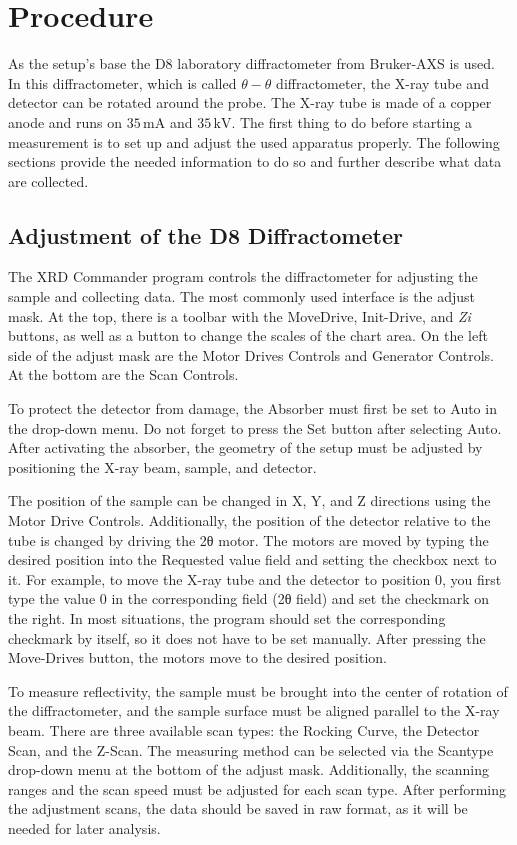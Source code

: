 \section{Procedure}

As the setup's base the D8 laboratory diffractometer from Bruker-AXS is used.
In this diffractometer, which is called $\theta - \theta$ diffractometer, the X-ray tube and detector can be rotated around the probe.
The X-ray tube is made of a copper anode and runs on $35\, \unit{\milli \ampere}$ and $35\, \unit{\kilo \volt}$.
The first thing to do before starting a measurement is to set up and adjust the used apparatus properly. 
The following sections provide the needed information to do so and further describe what data are collected.


\subsection{Adjustment of the D8 Diffractometer}
The XRD Commander program controls the diffractometer for adjusting the sample and collecting data. The most commonly used interface is the adjust mask. At the top, there is a toolbar with the MoveDrive, Init-Drive, and \textit{Zi} buttons, as well as a button to change the scales of the chart area. On the left side of the adjust mask are the Motor Drives Controls and Generator Controls. At the bottom are the Scan Controls.

To protect the detector from damage, the Absorber must first be set to Auto in the drop-down menu. Do not forget to press the Set button after selecting Auto. After activating the absorber, the geometry of the setup must be adjusted by positioning the X-ray beam, sample, and detector.

The position of the sample can be changed in X, Y, and Z directions using the Motor Drive Controls. Additionally, the position of the detector relative to the tube is changed by driving the 2θ motor. The motors are moved by typing the desired position into the Requested value field and setting the checkbox next to it. For example, to move the X-ray tube and the detector to position 0, you first type the value 0 in the corresponding field (2θ field) and set the checkmark on the right. In most situations, the program should set the corresponding checkmark by itself, so it does not have to be set manually. After pressing the Move-Drives button, the motors move to the desired position.

To measure reflectivity, the sample must be brought into the center of rotation of the diffractometer, and the sample surface must be aligned parallel to the X-ray beam. There are three available scan types: the Rocking Curve, the Detector Scan, and the Z-Scan. The measuring method can be selected via the Scantype drop-down menu at the bottom of the adjust mask. Additionally, the scanning ranges and the scan speed must be adjusted for each scan type. After performing the adjustment scans, the data should be saved in raw format, as it will be needed for later analysis.

